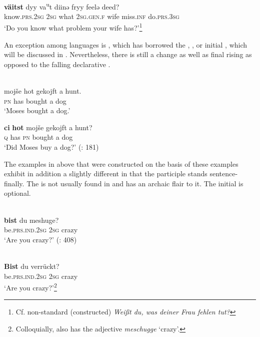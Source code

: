 \ea%
    \label{ex:indo:2}
    \\
    \gll \textbf{{väitst}} dyy  va\textsuperscript{u}t  diinə    fryy  feelə    deed?\\
    know.\textsc{prs}.2\textsc{sg}  2\textsc{sg}  what  2\textsc{sg.gen.f}  wife  miss.\textsc{inf}  do.\textsc{prs.}3\textsc{sg}\\
    \glt ‘Do you know what problem your wife has?’\footnote{Cf. non-standard  (constructed) \textit{Weißt du, was deiner Frau fehlen tut?}} \citep[170]{Jedig2014}
    \z

An exception among  languages is , which has borrowed the , , or  initial , which will be discussed in . Nevertheless, there is still a  change as well as final rising  as opposed to the falling declarative .

\ea%
    \label{ex:indo:3}
    \\
    \ea
    \gll mojše  hot    gekojft    a  hunt.\\
    \textsc{pn}  has    bought    a  dog\\
    \glt ‘Moses bought a dog.’
    
    \ex
    \gll \textbf{{ci}} \textbf{{hot}} mojše  gekojft    a  hunt?\\
    \textsc{q}  has  \textsc{pn}  bought    a  dog\\
    \glt ‘Did Moses buy a dog?’ (\citealt{SadockZwicky1985}: 181)
    \z
    \z

\noindent The  examples in  above that were constructed on the basis of these  examples exhibit in addition a slightly different  in that the participle stands sentence-finally. The   is not usually found in  and has an archaic flair to it. The initial  is optional.

\ea%
    \label{ex:indo:4}
    \\
    \gll \textbf{{bist}} du  meshuge?\\
    be.\textsc{prs.ind}.2\textsc{sg}  2\textsc{sg}  crazy\\
    \glt ‘Are you crazy?’ (\citealt{JacobsPrincevanderAuwera1994}: 408)
    \z

\ea%
    \label{ex:indo:5}
    \\
    \gll \textbf{{Bist}} du  verrückt?\\
    be.\textsc{prs.ind}.2\textsc{sg}  2\textsc{sg}  crazy\\
    \glt ‘Are you crazy?’\footnote{Colloquially,  also has the adjective \textit{meschugge} ‘crazy’.}
    \z

